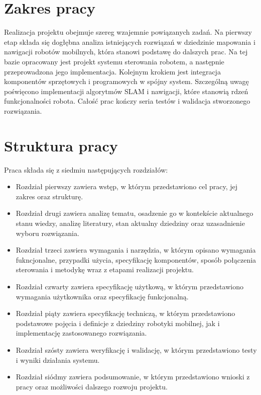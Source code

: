 \documentclass[a4paper,twoside,12pt]{book}
\begin{document}
\section{Zakres pracy}
Realizacja projektu obejmuje szereg wzajemnie powiązanych zadań. Na pierwszy etap składa się dogłębna analiza istniejących rozwiązań w dziedzinie mapowania i nawigacji robotów mobilnych, która stanowi podstawę do dalszych prac. Na tej bazie opracowany jest projekt systemu sterowania robotem, a następnie przeprowadzona jego implementacja. Kolejnym krokiem jest integracja komponentów sprzętowych i programowych w spójny system. Szczególną uwagę poświęcono implementacji algorytmów SLAM i nawigacji, które stanowią rdzeń funkcjonalności robota. Całość prac kończy seria testów i walidacja stworzonego rozwiązania.



\section{Struktura pracy}
Praca składa się z siedmiu następujących rozdziałów:
\begin{itemize}
\item Rozdział pierwszy zawiera wstęp, w którym przedstawiono cel pracy, jej zakres oraz strukturę.
\item Rozdział drugi zawiera analizę tematu, osadzenie go w kontekście aktualnego stanu wiedzy, analizę literatury, stan aktualny dziedziny oraz uzasadnienie wyboru rozwiązania.
\item Rozdział trzeci zawiera wymagania i narzędzia, w którym opisano wymagania fukncjonalne, przypadki użycia, specyfikację komponentów, sposób połączenia sterowania i metodykę wraz z etapami realizacji projektu.
\item Rozdział czwarty zawiera specyfikację użytkową, w którym przedstawiono wymagania użytkownika oraz specyfikację funkcjonalną.
\item Rozdział piąty zawiera specyfikację techniczą, w którym przedstawiono podstawowe pojęcia i definicje z dziedziny robotyki mobilnej, jak i implementację zastosowanego rozwiązania.
\item Rozdział szósty zawiera weryfikację i walidację, w którym przedstawiono testy i wyniki działania systemu.
\item Rozdział siódmy zawiera podsumowanie, w którym przedstawiono wnioski z pracy oraz możliwości dalszego rozwoju projektu.
\end{itemize}
\end{document}
